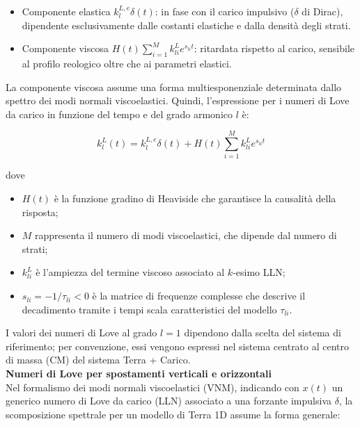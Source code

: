 \documentclass[a4paper,12pt]{book}
\begin{document}
\begin{itemize}
    \item Componente elastica $k_l^{L,e} \delta (t)$: in fase con il carico impulsivo ($\delta$ di Dirac), dipendente esclusivamente dalle costanti elastiche e dalla densità degli strati.
    \item Componente viscosa $H(t) \sum_{i=1} ^M k_{li}^L e^{s_{li}t}$: ritardata rispetto al carico, sensibile al profilo reologico oltre che ai parametri elastici.
\end{itemize}

\noindent
La componente viscosa assume una forma multiesponenziale determinata dallo spettro dei modi normali viscoelastici.
Quindi, l'espressione per i numeri di Love da carico in funzione del tempo e del grado armonico $l$ è:

\begin{equation}
    k_l^L (t) = k_l^{L,e} \delta (t) + H(t) \sum_{i=1} ^M k_{li}^L e^{s_{li}t}
\end{equation}

\noindent
dove 
\begin{itemize}
    \item $H(t)$ è la funzione gradino di Heaviside che garantisce la causalità della risposta;
    \item $M$ rappresenta il numero di modi viscoelastici, che dipende dal numero di strati;
    \item $k_{li}^L$ è l'ampiezza del termine viscoso associato al $k$-esimo LLN;
    \item $s_{li} = - 1/\tau_{li}<0$ è la matrice di frequenze complesse che descrive il decadimento tramite i tempi scala caratteristici del modello $\tau_{li}$.\\
\end{itemize}

\noindent
I valori dei numeri di Love al grado $l=1$ dipendono dalla scelta del sistema di riferimento;
per convenzione, essi vengono espressi nel sistema centrato al centro di massa (CM) del sistema Terra + Carico.\\

\noindent \textbf{\textcolor{colore7}{Numeri di Love per spostamenti verticali e orizzontali}}\\

\noindent
Nel formalismo dei modi normali viscoelastici (VNM), indicando con $x(t)$ un generico numero di Love da carico (LLN) associato a una forzante impulsiva $\delta$,
la scomposizione spettrale per un modello di Terra 1D assume la forma generale:
\end{document}
